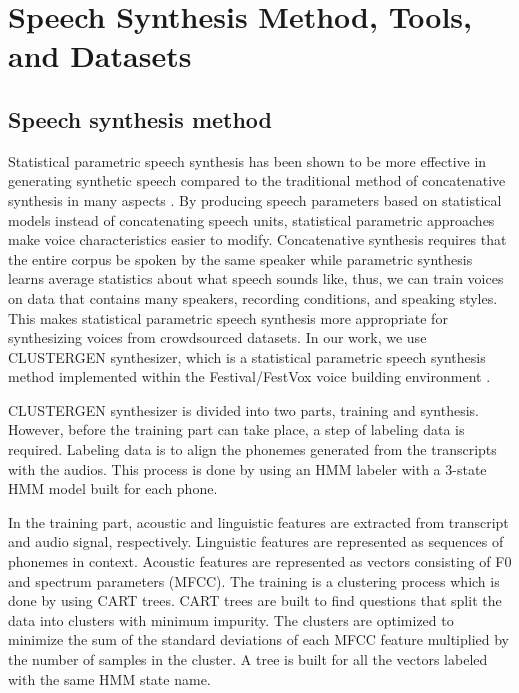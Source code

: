 \documentclass[12pt]{article}
\begin{document}

\clearpage
\section{Speech Synthesis Method, Tools, and Datasets}\label{sec_methodToolsDatasets}

\subsection{Speech synthesis method}
Statistical parametric speech synthesis has been shown to be more effective in generating synthetic speech compared to the traditional method of concatenative synthesis in many aspects \cite{SPSS}. By producing speech parameters based on statistical models instead of concatenating speech units, statistical parametric approaches  make voice characteristics easier to modify. Concatenative synthesis requires that the entire corpus be spoken by the same speaker while parametric synthesis learns average statistics about what speech sounds like, thus, we can train voices on data that contains many speakers, recording conditions, and speaking styles. This makes statistical parametric speech synthesis more appropriate for synthesizing voices from crowdsourced datasets. In our work, we use CLUSTERGEN synthesizer, \cite{clustergen} which is a statistical parametric speech synthesis method implemented within the Festival/FestVox voice building environment \cite{festvox:2014}.

CLUSTERGEN synthesizer is divided into two parts, training and synthesis. However, before the training part can take place, a step of labeling data is required. Labeling data is to align the phonemes generated from the transcripts with the audios. This process is done by using an HMM labeler with a 3-state HMM model built for each phone.

In the training part, acoustic and linguistic features are extracted from transcript and audio signal, respectively. Linguistic features are represented as sequences of phonemes in context. Acoustic features are represented as vectors consisting of F0 and spectrum parameters (MFCC). The training is a clustering process which is done by using CART trees. CART trees are built to find questions that split the data into clusters with minimum impurity. The clusters are optimized to minimize the sum of the standard deviations of each MFCC feature multiplied by the number of samples in the cluster. A tree is built for all the vectors labeled with the same HMM state name.
\end{document}
